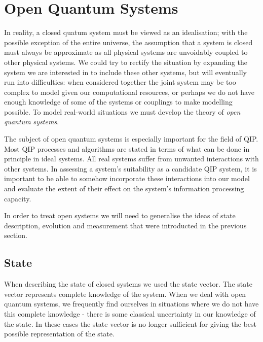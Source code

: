 \section{Open Quantum Systems}

In reality, a closed quatum system must be viewed as an idealisation; with the possible exception of the entire universe, the assumption that a system is closed must always be approximate as all physical systems are unvoidably coupled to other physical systems. We could try to rectify the situation by expanding the system we are interested in to include these other systems, but will eventually run into difficulties: when considered together the joint system may be too complex to model given our computational resources, or perhaps we do not have enough knowledge of some of the systems or couplings to make modelling possible. To model real-world situations we must develop the theory of \textit{open quantum systems}. 

The subject of open quantum systems is especially important for the field of QIP. Most QIP processes and algorithms are stated in terms of what can be done in principle in ideal systems. All real systems suffer from unwanted interactions with other systems. In assessing a system's suitability as a candidate QIP system, it is important to be able to somehow incorporate these interactions into our model and evaluate the extent of their effect on the system's information processing capacity.

In order to treat open systems we will need to generalise the ideas of state description, evolution and measurement that were introducted in the previous section.



\subsection{State}

When describing the state of closed systems we used the state vector. The state vector represents complete knowledge of the system. When we deal with open quantum systems, we frequently find ourselves in situations where we do not have this complete knowledge - there is some classical uncertainty in our knowledge of the state. In these cases the state vector is no longer sufficient for giving the best possible representation of the state. 

